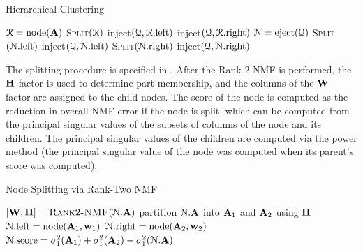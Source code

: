 \documentclass[conference,compsoc]{IEEEtran}
\begin{document}
\begin{algorithm}
\caption{Hierarchical Clustering \cite{KP13}}
\label{alg:hiernmf2}
\begin{algorithmic}[1]
		\State ${\cal R} = \text{node}(\M{A})$ \hfill {}
		\State \textsc{Split}$({\cal R})$
		\State inject$({\cal Q},{\cal R}.\text{left})$ \hfill {}
		\State inject$({\cal Q},{\cal R}.\text{right})$ \hfill {}
			\State ${\cal N} = \text{eject}({\cal Q})$ \hfill {}
			\State \textsc{Split}$({\cal N}.\text{left})$ \hfill {}
			\State inject$({\cal Q},{\cal N}.\text{left})$ \hfill {}
			\State \textsc{Split}$({\cal N}.\text{right})$ \hfill {}
			\State inject$({\cal Q},{\cal N}.\text{right})$ \hfill {}
		\EndWhile
	\EndFunction
\end{algorithmic}
\end{algorithm}

The splitting procedure is specified in .
After the Rank-2 NMF is performed, the $\M{H}$ factor is used to determine part membership, and the columns of the $\M{W}$ factor are assigned to the child nodes.
The score of the node is computed as the reduction in overall NMF error if the node is split, which can be computed from the principal singular values of the subsets of columns of the node and its children.
The principal singular values of the children are computed via the power method (the principal singular value of the node was computed when its parent's score was computed).

\begin{algorithm}
\caption{Node Splitting via Rank-Two NMF}
\label{alg:split}
\begin{algorithmic}[1]
		\State $[\M{W},\M{H}] = \textsc{Rank2-NMF}({\cal N}.\M{A})$ \hfill {}
		\State partition ${\cal N}.\M{A}$ into $\M{A}_1$ and $\M{A}_2$ using $\M{H}$
		\State ${\cal N}.\text{left} = \text{node}(\M{A}_1,\V{W}_1)$ \hfill {}
		\State ${\cal N}.\text{right} = \text{node}(\M{A}_2,\V{W}_2)$ \hfill {}
		\State ${\cal N}.\text{score} = \sigma_1^2(\M{A}_1) + \sigma_1^2(\M{A}_2) - \sigma_1^2({\cal N}.\M{A})$
	\EndFunction
\end{algorithmic}
\end{algorithm}
\end{document}

